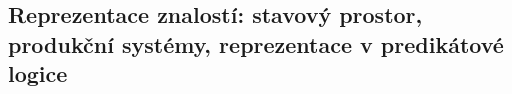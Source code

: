 \subsection{Reprezentace znalostí: stavový prostor, produkční systémy, reprezentace v predikátové logice}
